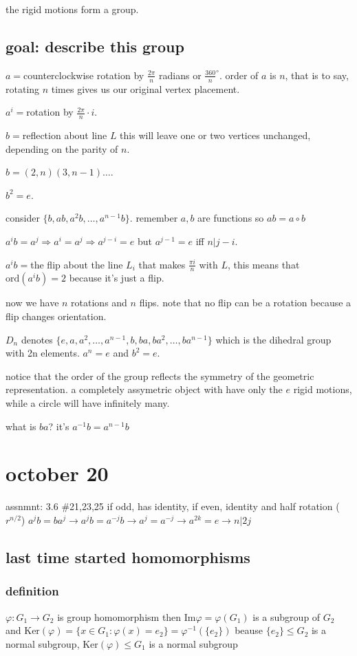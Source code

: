 \documentclass[letterpaper]{article}
\begin{document}
the rigid motions form a group.
\subsection*{goal: describe this group}
$a=$counterclockwise rotation by $\frac{2\pi}{n}$ radians or $\frac{360}{n}^\circ$. order of $a$ is $n$, that is to say, rotating $n$ times gives us our original vertex placement.

$a^i=$rotation by $\frac{2\pi}{n}\cdot i$.

$b=$reflection about line $L$ this will leave one or two vertices unchanged, depending on the parity of $n$.

$b=(2,n)(3,n-1)\dots$.

$b^2=e$.

consider $\{b,ab,a^2b,\dots,a^{n-1}b\}$. remember $a,b$ are functions so $ab=a\circ b$

$a^ib=a^j\Rightarrow a^i=a^j\Rightarrow a^{j-i}=e$ but $a^{j-1}=e$ iff $n|j-i$.

$a^ib=$the flip about the line $L_i$ that makes $\frac{\pi i}{n}$ with $L$, this means that $\text{ord}(a^ib)=2$ because it's just a flip.

now we have $n$ rotations and $n$ flips. note that no flip can be a rotation because a flip changes orientation.

$D_n$ denotes $\{e,a,a^2,\dots,a^{n-1},b,ba,ba^2,\dots,ba^{n-1}\}$ which is the dihedral group with 2n elements. $a^n=e$ and $b^2=e$.

notice that the order of the group reflects the symmetry of the geometric representation. a completely assymetric object with have only the $e$ rigid motions, while a circle will have infinitely many.

what is $ba$? it's $a^{-1}b=a^{n-1}b$

\section*{october 20}
assnmnt: 3.6 \#21,23,25
if odd, has identity, if even, identity and half rotation ($r^{n/2}$)
$a^jb=ba^j\to a^jb=a^{-j}b\to a^j=a^{-j}\to a^{2k}=e\to n|2j$

\subsection*{last time started homomorphisms}
\subsubsection*{definition}
$\varphi:G_1\to G_2$ is group homomorphism then $\text{Im}\varphi=\varphi(G_1)$ is a subgroup of $G_2$ and $\text{Ker}(\varphi)=\{x\in G_1:\varphi(x)=e_2\}=\varphi^{-1}(\{e_2\})$ beause $\{e_2\}\le G_2$ is a normal subgroup, $\text{Ker}(\varphi)\le G_1$ is a normal subgroup
\end{document}
